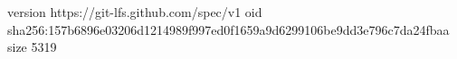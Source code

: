 version https://git-lfs.github.com/spec/v1
oid sha256:157b6896e03206d1214989f997ed0f1659a9d6299106be9dd3e796c7da24fbaa
size 5319
